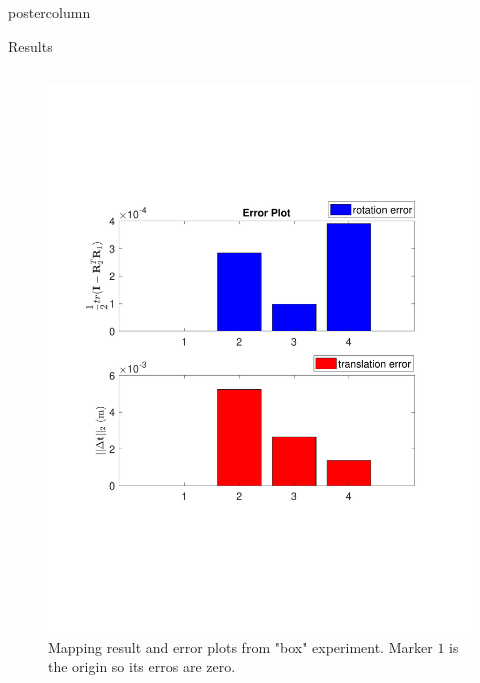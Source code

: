 \documentclass{beamer}
\begin{document}
\begin{frame}
\begin{columns}
\begin{column}{.57\textwidth}
\begin{beamercolorbox}[center]{postercolumn}
\begin{minipage}{.98\textwidth}
{\begin{myblock}{Results}
\begin{minipage}[0.3\textheight]{\textwidth}
\begin{columns}[T]
\begin{column}{0.33\textwidth}
\begin{figure}
\includegraphics[width=1.0\textwidth]{img/box_rt_new}
\caption{Mapping result and error plots from "box" experiment. Marker $1$ is the origin so its erros are zero.}
\label{fig:box_res}
\end{figure}
\end{column}


\end{columns}
\end{minipage}
\end{myblock}}
\end{minipage}
\end{beamercolorbox}
\end{column}
\end{columns}
\end{frame}
\end{document}
